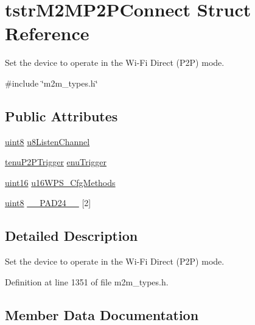\hypertarget{structtstrM2MP2PConnect}{}\section{tstr\+M2\+M\+P2\+P\+Connect Struct Reference}
\label{structtstrM2MP2PConnect}


Set the device to operate in the Wi-\/\+Fi Direct (P2P) mode.  




{\ttfamily \#include \char`\"{}m2m\+\_\+types.\+h\char`\"{}}

\subsection*{Public Attributes}
\begin{DoxyCompactItemize}
\item 
\hyperlink{group__DataT_ga4df709a77647e870bbf1d955b8edc9a6}{uint8} \hyperlink{structtstrM2MP2PConnect_a6c92e28e2b614f6f024cc69d2da27c51}{u8\+Listen\+Channel}
\item 
\hyperlink{group__WlanEnums_ga0b97cca65d26d6163cabcb708e5759df}{tenu\+P2\+P\+Trigger} \hyperlink{structtstrM2MP2PConnect_a760354e813b16c4b71f716a365f1347e}{enu\+Trigger}
\item 
\hyperlink{group__DataT_ga1daa745171fc6e31d942c161422a76f9}{uint16} \hyperlink{structtstrM2MP2PConnect_aa4e2e9393359cd24e0c75136a0515f75}{u16\+W\+P\+S\+\_\+\+Cfg\+Methods}
\item 
\hyperlink{group__DataT_ga4df709a77647e870bbf1d955b8edc9a6}{uint8} \hyperlink{structtstrM2MP2PConnect_a178ba13d5efab8a71ac5a01b6686f087}{\+\_\+\+\_\+\+P\+A\+D24\+\_\+\+\_\+} \mbox{[}2\mbox{]}
\end{DoxyCompactItemize}


\subsection{Detailed Description}
Set the device to operate in the Wi-\/\+Fi Direct (P2P) mode. 

Definition at line 1351 of file m2m\+\_\+types.\+h.



\subsection{Member Data Documentation}
\mbox{\label{structtstrM2MP2PConnect_a178ba13d5efab8a71ac5a01b6686f087}} 
